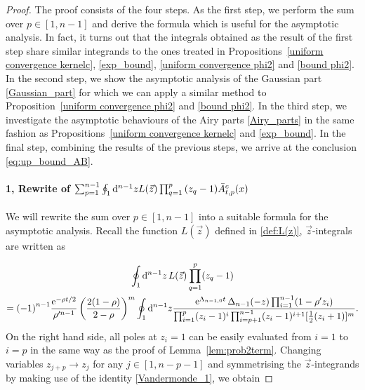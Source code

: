 \documentclass[cmp]{svjour}
\numberwithin{theorem}{section}
\numberwithin{equation}{section}
\DeclareMathOperator{\e}{e}
\def\dd{{\rm d}}
\begin{document}
\begin{proof}
The proof consists of the four steps. As the first step, we perform the sum over $p \in [1,n-1]$ and derive the formula which is useful for the asymptotic analysis.
In fact, it turns out that the integrals obtained as the result of the first step share similar integrands to the ones treated in Propositions~\ref{uniform convergence kernelc}, \ref{exp_bound}, \ref{uniform convergence phi2} and \ref{bound phi2}.
In the second step, we show the asymptotic analysis of the Gaussian part \eqref{Gaussian_part} for which we can apply a similar method to Proposition~\ref{uniform convergence phi2} and \ref{bound phi2}.
In the third step, we investigate the asymptotic behaviours of the Airy parts \eqref{Airy_parts} in the same fashion as Propositions~\ref{uniform convergence kernelc} and \ref{exp_bound}.
In the final step, combining the results of the previous steps, we arrive at the conclusion \eqref{eq:up_bound_AB}.



\paragraph{1, Rewrite of $\sum_{p=1}^{n-1} \oint_1 \dd^{n-1} z L(\vec{z}) \prod_{q = 1}^{p}{(z_q - 1)} \bar{A}^c_{t,p}(x)$}

We will rewrite the sum over $p \in [1,n-1]$ into a suitable formula for the asymptotic analysis.
Recall the function $L(\vec{z})$  defined in \eqref{def:L(z)}, $\vec{z}$-integrals are written as

\begin{multline*}
\oint_1 \dd^{n-1} z\,  L(\vec{z}) \prod_{q=1}^{p}(z_q-1) \\
= {(-1)}^{n-1}
\frac{\e^{-\rho t/2}}{\rho'^{n-1}} \left(\frac{2(1-\rho)}{2-\rho}\right)^m
\oint_{1}\dd^{n-1}z
\frac{\e^{\Lambda_{n-1,0} t}
\Delta_{n-1}(-z)
\prod_{i=1}^{n-1} (1-\rho'z_i) }
{\prod_{i=1}^{p}(z_i-1)^{i}
\prod_{i=p+1}^{n-1}(z_i-1)^{i+1}
[\frac{1}{2}(z_i+1)]^m}.
\end{multline*}
On the right hand side, all poles at $z_i = 1$ can be easily evaluated from $i=1$ to $i=p$ in the same way as the proof of Lemma~\ref{lem:prob2term}.
Changing variables $z_{j+p} \rightarrow z_j$ for any $j \in [1,n-p-1]$ and symmetrising the $\vec{z}$-integrands by making use of the identity \eqref{Vandermonde_1}, we obtain


\end{proof}
\end{document}
